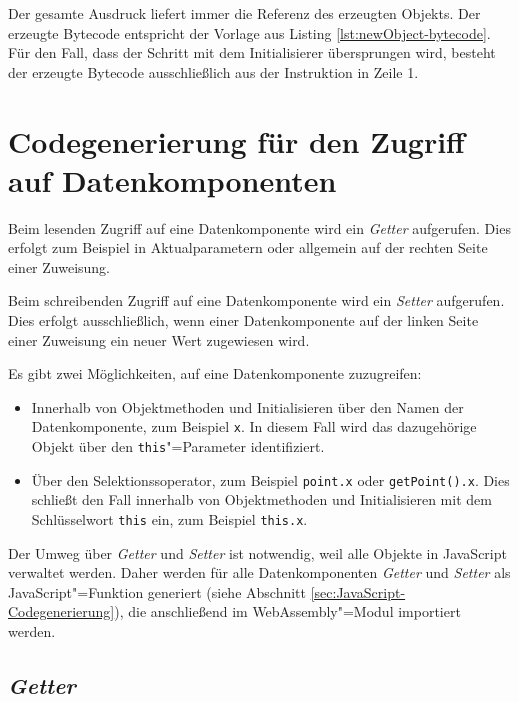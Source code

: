 Der gesamte Ausdruck liefert immer die Referenz des erzeugten Objekts. Der erzeugte Bytecode entspricht der Vorlage aus Listing \ref{lst:newObject-bytecode}. Für den Fall, dass der Schritt mit dem Initialisierer übersprungen wird, besteht der erzeugte Bytecode ausschließlich aus der Instruktion in Zeile 1.

\pagebreak


\section{Codegenerierung für den Zugriff auf Datenkomponenten}
\label{sec:Codegenerierung-für-den-Zugriff-auf-Datenkomponenten}

Beim lesenden Zugriff auf eine Datenkomponente wird ein \emph{Getter} aufgerufen. Dies erfolgt zum Beispiel in Aktualparametern oder allgemein auf der rechten Seite einer Zuweisung.

Beim schreibenden Zugriff auf eine Datenkomponente wird ein \emph{Setter} aufgerufen. Dies erfolgt ausschließlich, wenn einer Datenkomponente auf der linken Seite einer Zuweisung ein neuer Wert zugewiesen wird.

Es gibt zwei Möglichkeiten, auf eine Datenkomponente zuzugreifen:
\begin{itemize}
    \item Innerhalb von Objektmethoden und Initialisieren über den Namen der Datenkomponente, zum Beispiel \lstinline{x}. In diesem Fall wird das dazugehörige Objekt über den \lstinline{this}"=Parameter identifiziert.
    \item Über den Selektionssoperator, zum Beispiel \lstinline{point.x} oder \lstinline{getPoint().x}. Dies schließt den Fall innerhalb von Objektmethoden und Initialisieren mit dem Schlüsselwort \lstinline{this} ein, zum Beispiel \lstinline{this.x}.
\end{itemize}

Der Umweg über \emph{Getter} und \emph{Setter} ist notwendig, weil alle Objekte in JavaScript verwaltet werden. Daher werden für alle Datenkomponenten \emph{Getter} und \emph{Setter} als JavaScript"=Funktion generiert (siehe Abschnitt \ref{sec:JavaScript-Codegenerierung}), die anschließend im WebAssembly"=Modul importiert werden.

\subsection{\emph{Getter}}

